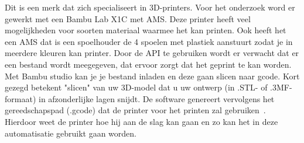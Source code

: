 Dit is een merk dat zich specialiseert in 3D-printers. Voor het onderzoek word er gewerkt met een Bambu Lab X1C met AMS. Deze printer heeft veel mogelijkheden voor soorten materiaal waarmee het kan printen. Ook heeft het een AMS dat is een spoelhouder de 4 spoelen met plastiek aanstuurt zodat je in meerdere kleuren kan printer. Door de API te gebruiken wordt er verwacht dat er een bestand wordt meegegeven, dat ervoor zorgt dat het geprint te kan worden. Met Bambu studio kan je je bestand inladen en deze gaan slicen naar gcode. Kort gezegd betekent "slicen" van uw 3D-model dat u uw ontwerp (in .STL- of .3MF-formaat) in afzonderlijke lagen snijdt. De software genereert vervolgens het gereedschapspad (.gcode) dat de printer voor het printen zal gebruiken~\autocite{herrickLibrarySlicing}. Hierdoor weet de printer hoe hij aan de slag kan gaan en zo kan het in deze automatisatie gebruikt gaan worden. 







